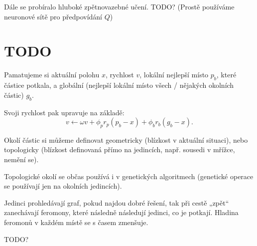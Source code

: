 \documentclass[12pt]{article}					%
\begin{document}

\begin{definice}
	Dále se probíralo hluboké zpětnovazebné učení. TODO? (Prostě používáme neuronové sítě pro předpovídání $Q$)
\end{definice}


\section{TODO}

\begin{definice}
	Pamatujeme si aktuální polohu $x$, rychlost $v$, lokální nejlepší místo $p_b$, které částice potkala, a globální (nejlepší lokální místo všech / nějakých okolních částic) $g_b$.

	Svoji rychlost pak upravuje na základě:
	$$ v \leftarrow \omega v + \phi_p r_p (p_b - x) + \phi_b r_b (g_b - x). $$
\end{definice}

\begin{poznamka}
	Okolí částic si můžeme definovat geometricky (blízkost v aktuální situaci), nebo topologicky (blízkost definovaná přímo na jedincích, např. sousedi v mřížce, nemění se).

	Topologické okolí se občas používá i v genetických algoritmech (genetické operace se používají jen na okolních jedincích).
\end{poznamka}

\begin{definice}
	Jedinci prohledávají graf, pokud najdou dobré řešení, tak při cestě „zpět“ zanechávají feromony, které následně následují jedinci, co je potkají. Hladina feromonů v každém místě se s časem zmenšuje.
\end{definice}

\begin{definice}
	TODO?
\end{definice}
\end{document}
